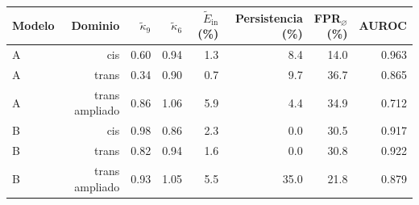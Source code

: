 \begin{tabular}{lrrrrrrr}
\toprule
Modelo & Dominio & $\tilde\kappa_{9}$ & $\tilde\kappa_{6}$ & $\tilde E_{\mathrm{in}}$ (\%) & Persistencia (\%) & FPR$_\varnothing$ (\%) & AUROC \\
\midrule
A & cis & 0.60 & 0.94 & 1.3 & 8.4 & 14.0 & 0.963 \\
A & trans & 0.34 & 0.90 & 0.7 & 9.7 & 36.7 & 0.865 \\
A & trans ampliado & 0.86 & 1.06 & 5.9 & 4.4 & 34.9 & 0.712 \\
\midrule
B & cis & 0.98 & 0.86 & 2.3 & 0.0 & 30.5 & 0.917 \\
B & trans & 0.82 & 0.94 & 1.6 & 0.0 & 30.8 & 0.922 \\
B & trans ampliado & 0.93 & 1.05 & 5.5 & 35.0 & 21.8 & 0.879 \\
\bottomrule
\end{tabular}
